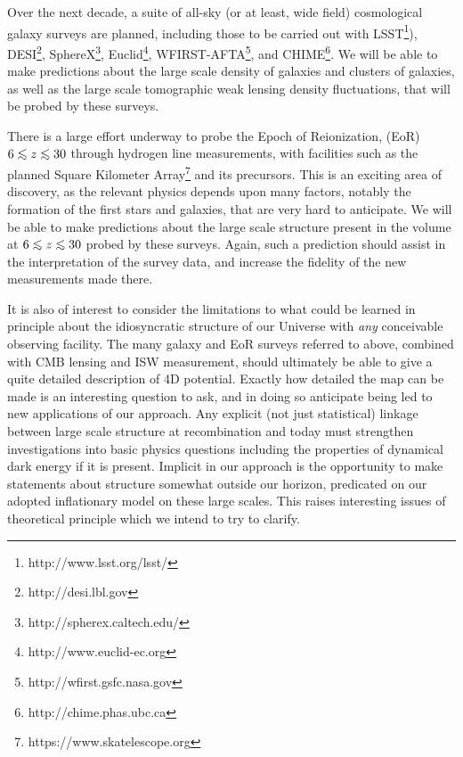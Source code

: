 \documentclass[psfig,12pt]{article}
\def\lo{\mathrel{\raise.3ex\hbox{$<$}\mkern-14mu\lower0.6ex\hbox{$\sim$}}}
\begin{document}
{Over the next decade, a suite of all-sky (or at least, wide field)
cosmological galaxy surveys are planned, including those to be carried
out with
LSST\footnote{http://www.lsst.org/lsst/}),
DESI\footnote{http://desi.lbl.gov},
SphereX\footnote{http://spherex.caltech.edu/},
Euclid\footnote{http://www.euclid-ec.org},
WFIRST-AFTA\footnote{http://wfirst.gsfc.nasa.gov}, and
CHIME\footnote{http://chime.phas.ubc.ca}.
We will be able to make predictions about the large scale density
of galaxies and clusters of galaxies, as well as the large scale
tomographic weak lensing density fluctuations, that will be probed by
these surveys.

There is a large effort underway to probe the Epoch of Reionization,
(EoR) $6\lo z\lo30$ through hydrogen line measurements, with facilities
such as the planned Square Kilometer
Array\footnote{https://www.skatelescope.org} and its precursors. This is
an exciting area of discovery, as the relevant physics depends upon many
factors, notably the formation of the first stars and galaxies,  that
are very hard to anticipate. We will be able to make predictions about
the large scale structure present in the volume at $6\lo z\lo30$ probed
by these surveys. Again, such a prediction should assist in the
interpretation of the survey data, and increase the fidelity of the new
measurements made there.

It is also of interest to consider the limitations to what could be
learned in principle about the idiosyncratic structure of our Universe
with {\it any} conceivable observing facility. The many galaxy and EoR
surveys referred to above, combined with CMB lensing and ISW
measurement, should ultimately be able to give a quite detailed
description of 4D potential. Exactly how detailed the map can be made
is an interesting question to ask, and in doing so anticipate being led
to new applications of our approach.
Any explicit
(not just statistical) linkage between large scale structure at
recombination and today must strengthen investigations into basic
physics questions including the properties of dynamical dark energy
if it is present. Implicit in our approach is the
opportunity to make statements about structure somewhat outside our
horizon, predicated on our adopted inflationary model on these large
scales. This raises interesting
issues of theoretical principle which we intend to try to clarify.



}
\end{document}
